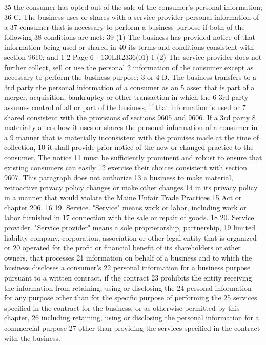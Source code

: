 35 the consumer has opted out of the sale of the consumer's personal information;
36 C. The business uses or shares with a service provider personal information of a
37 consumer that is necessary to perform a business purpose if both of the following
38 conditions are met:
39 (1) The business has provided notice of that information being used or shared in
40 its terms and conditions consistent with section 9610; and
1
2
Page 6 - 130LR2336(01)
1 (2) The service provider does not further collect, sell or use the personal
2 information of the consumer except as necessary to perform the business purpose;
3 or
4 D. The business transfers to a 3rd party the personal information of a consumer as an
5 asset that is part of a merger, acquisition, bankruptcy or other transaction in which the
6 3rd party assumes control of all or part of the business, if that information is used or
7 shared consistent with the provisions of sections 9605 and 9606. If a 3rd party
8 materially alters how it uses or shares the personal information of a consumer in a
9 manner that is materially inconsistent with the promises made at the time of collection,
10 it shall provide prior notice of the new or changed practice to the consumer. The notice
11 must be sufficiently prominent and robust to ensure that existing consumers can easily
12 exercise their choices consistent with section 9607. This paragraph does not authorize
13 a business to make material, retroactive privacy policy changes or make other changes
14 in its privacy policy in a manner that would violate the Maine Unfair Trade Practices
15 Act or chapter 206.
16 19. Service. "Service" means work or labor, including work or labor furnished in
17 connection with the sale or repair of goods.
18 20. Service provider. "Service provider" means a sole proprietorship, partnership,
19 limited liability company, corporation, association or other legal entity that is organized or
20 operated for the profit or financial benefit of its shareholders or other owners, that processes
21 information on behalf of a business and to which the business discloses a consumer's
22 personal information for a business purpose pursuant to a written contract, if the contract
23 prohibits the entity receiving the information from retaining, using or disclosing the
24 personal information for any purpose other than for the specific purpose of performing the
25 services specified in the contract for the business, or as otherwise permitted by this chapter,
26 including retaining, using or disclosing the personal information for a commercial purpose
27 other than providing the services specified in the contract with the business.
